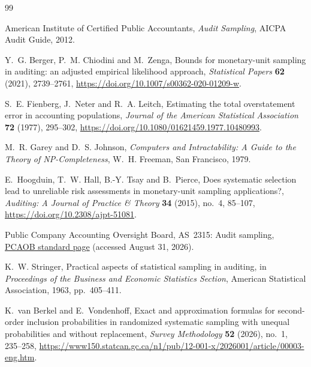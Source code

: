 \documentclass[11pt]{article}
\theoremstyle{definition}
\begin{document}
\begin{thebibliography}{99}

 American Institute of Certified Public Accountants,
\emph{Audit Sampling}, AICPA Audit Guide, 2012.

 Y.~G. Berger, P.~M. Chiodini and M.~Zenga, Bounds for
monetary-unit sampling in auditing: an adjusted empirical likelihood
approach, \emph{Statistical Papers} \textbf{62} (2021), 2739--2761,
\url{https://doi.org/10.1007/s00362-020-01209-w}.

 S.~E. Fienberg, J.~Neter and R.~A. Leitch,
Estimating the total overstatement error in accounting populations,
\emph{Journal of the American Statistical Association} \textbf{72} (1977),
295--302, \url{https://doi.org/10.1080/01621459.1977.10480993}.

 M.~R. Garey and D.~S. Johnson,
\emph{Computers and Intractability: A Guide to the Theory of
NP-Completeness}, W.~H. Freeman, San Francisco, 1979.

 E.~Hoogduin, T.~W. Hall, B.-Y. Tsay and B.~Pierce,
Does systematic selection lead to unreliable risk assessments in
monetary-unit sampling applications?, \emph{Auditing: A Journal of Practice
\& Theory} \textbf{34} (2015), no.~4, 85--107,
\url{https://doi.org/10.2308/ajpt-51081}.

 Public Company Accounting Oversight Board, AS~2315:
Audit sampling,
\href{https://pcaobus.org/oversight/standards/auditing-standards/details/AS2315}
{PCAOB standard page} (accessed August 31, 2026).

 K.~W. Stringer, Practical aspects of statistical
sampling in auditing, in \emph{Proceedings of the Business and Economic
Statistics Section}, American Statistical Association, 1963, pp.~405--411.

 K.~van Berkel and E.~Vondenhoff, Exact and
approximation formulas for second-order inclusion probabilities in randomized
systematic sampling with unequal probabilities and without replacement,
\emph{Survey Methodology} \textbf{52} (2026), no.~1, 235--258,
\url{https://www150.statcan.gc.ca/n1/pub/12-001-x/2026001/article/00003-eng.htm}.

\end{thebibliography}
\end{document}
